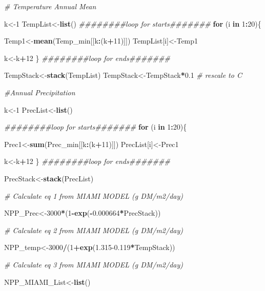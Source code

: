 \documentclass[
  10pt,
  b5paper,
]{book}
\newenvironment{Shaded}{\begin{snugshade}}{\end{snugshade}}
\newcommand{\CommentTok}[1]{\textcolor[rgb]{0.56,0.35,0.01}{\textit{#1}}}
\newcommand{\ControlFlowTok}[1]{\textcolor[rgb]{0.13,0.29,0.53}{\textbf{#1}}}
\newcommand{\DecValTok}[1]{\textcolor[rgb]{0.00,0.00,0.81}{#1}}
\newcommand{\FloatTok}[1]{\textcolor[rgb]{0.00,0.00,0.81}{#1}}
\newcommand{\KeywordTok}[1]{\textcolor[rgb]{0.13,0.29,0.53}{\textbf{#1}}}
\newcommand{\NormalTok}[1]{#1}
\newcommand{\OperatorTok}[1]{\textcolor[rgb]{0.81,0.36,0.00}{\textbf{#1}}}
\begin{document}
\begin{Shaded}
\begin{Highlighting}[]
\CommentTok{# Temperature Annual Mean }

\NormalTok{k<-}\DecValTok{1}
\NormalTok{TempList<-}\KeywordTok{list}\NormalTok{()}
\CommentTok{########loop for starts#######}
\ControlFlowTok{for}\NormalTok{ (i }\ControlFlowTok{in} \DecValTok{1}\OperatorTok{:}\DecValTok{20}\NormalTok{)\{}

\NormalTok{Temp1<-}\KeywordTok{mean}\NormalTok{(Temp_min[[k}\OperatorTok{:}\NormalTok{(k}\OperatorTok{+}\DecValTok{11}\NormalTok{)]])}
\NormalTok{TempList[i]<-Temp1}

\NormalTok{k<-k}\OperatorTok{+}\DecValTok{12}
\NormalTok{\}}
\CommentTok{########loop for ends#######}

\NormalTok{TempStack<-}\KeywordTok{stack}\NormalTok{(TempList)}
\NormalTok{TempStack<-TempStack}\OperatorTok{*}\FloatTok{0.1} \CommentTok{# rescale to C}

\CommentTok{#Annual Precipitation}

\NormalTok{k<-}\DecValTok{1}
\NormalTok{PrecList<-}\KeywordTok{list}\NormalTok{()}

\CommentTok{########loop for starts#######}
\ControlFlowTok{for}\NormalTok{ (i }\ControlFlowTok{in} \DecValTok{1}\OperatorTok{:}\DecValTok{20}\NormalTok{)\{}

\NormalTok{Prec1<-}\KeywordTok{sum}\NormalTok{(Prec_min[[k}\OperatorTok{:}\NormalTok{(k}\OperatorTok{+}\DecValTok{11}\NormalTok{)]])}
\NormalTok{PrecList[i]<-Prec1}

\NormalTok{k<-k}\OperatorTok{+}\DecValTok{12}
\NormalTok{\}}
\CommentTok{########loop for ends#######}

\NormalTok{PrecStack<-}\KeywordTok{stack}\NormalTok{(PrecList)}

\CommentTok{# Calculate eq 1 from MIAMI MODEL (g DM/m2/day)}

\NormalTok{NPP_Prec<-}\DecValTok{3000}\OperatorTok{*}\NormalTok{(}\DecValTok{1}\OperatorTok{-}\KeywordTok{exp}\NormalTok{(}\OperatorTok{-}\FloatTok{0.000664}\OperatorTok{*}\NormalTok{PrecStack))}

\CommentTok{# Calculate eq 2 from MIAMI MODEL (g DM/m2/day)}

\NormalTok{NPP_temp<-}\DecValTok{3000}\OperatorTok{/}\NormalTok{(}\DecValTok{1}\OperatorTok{+}\KeywordTok{exp}\NormalTok{(}\FloatTok{1.315-0.119}\OperatorTok{*}\NormalTok{TempStack))}

\CommentTok{# Calculate eq 3 from MIAMI MODEL (g DM/m2/day)}

\NormalTok{NPP_MIAMI_List<-}\KeywordTok{list}\NormalTok{()}


\end{Highlighting}
\end{Shaded}
\end{document}

